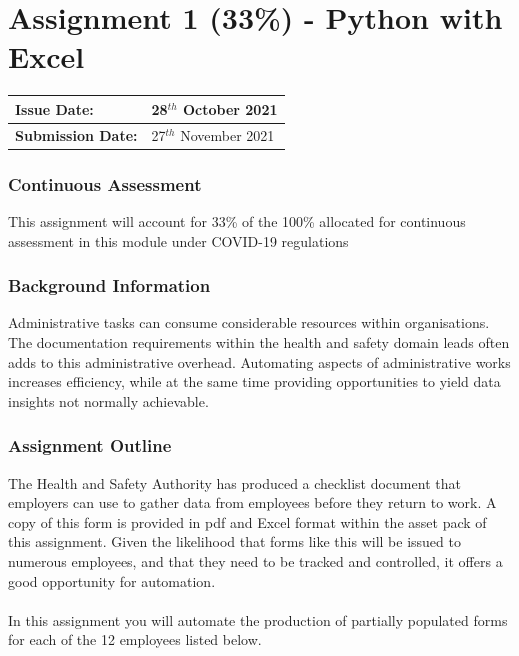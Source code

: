 
	
\part*{Assignment 1 (33\%) - Python with Excel}

\begin{tabularx}{\textwidth}{ |X|X| }
	\hline
	\textbf{Issue Date:} & 28$^{th}$ October 2021 \\
	\hline 
	\textbf{Submission Date:}  & 27$^{th}$ November 2021  \\
	\hline
\end{tabularx}


\section*{Continuous Assessment}
This assignment will account for 33\% of the 100\% allocated for continuous assessment in this module under COVID-19 regulations


\section*{Background Information}

Administrative tasks can consume considerable resources within organisations.  The documentation requirements within the health and safety domain leads often adds to this administrative overhead.  Automating aspects of administrative works increases efficiency, while at the same time providing opportunities to yield data insights not normally achievable.


\section*{Assignment Outline}

The Health and Safety Authority has produced a checklist document that employers can use to gather data from employees before they return to work.  A copy of this form is provided in pdf and Excel format within the asset pack of this assignment.  Given the likelihood that forms like this will be issued to numerous employees, and that they need to be tracked and controlled, it offers a good opportunity for automation.\\
\\
In this assignment you will automate the production of partially populated forms for each of the 12 employees listed below.\\

